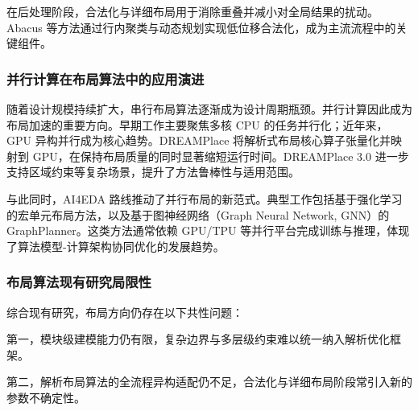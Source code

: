 在后处理阶段，合法化与详细布局用于消除重叠并减小对全局结果的扰动。Abacus\cite{10.1145/1353629.1353640} 等方法通过行内聚类与动态规划实现低位移合法化，成为主流流程中的关键组件。

\subsubsection{并行计算在布局算法中的应用演进}

随着设计规模持续扩大，串行布局算法逐渐成为设计周期瓶颈。并行计算因此成为布局加速的重要方向。早期工作主要聚焦多核 CPU 的任务并行化；近年来，GPU 异构并行成为核心趋势。DREAMPlace\cite{9122053} 将解析式布局核心算子张量化并映射到 GPU，在保持布局质量的同时显著缩短运行时间。DREAMPlace 3.0\cite{9256736} 进一步支持区域约束等复杂场景，提升了方法鲁棒性与适用范围。

与此同时，AI4EDA 路线推动了并行布局的新范式。典型工作包括基于强化学习的宏单元布局方法\cite{Mirhoseini2021AGP}，以及基于图神经网络（Graph Neural Network, GNN）的 GraphPlanner\cite{10.1145/3555804}。这类方法通常依赖 GPU/TPU 等并行平台完成训练与推理，体现了算法模型-计算架构协同优化的发展趋势。




\subsubsection{布局算法现有研究局限性}

综合现有研究，布局方向仍存在以下共性问题：

第一，模块级建模能力仍有限，复杂边界与多层级约束难以统一纳入解析优化框架。

第二，解析布局算法的全流程异构适配仍不足，合法化与详细布局阶段常引入新的参数不确定性。



